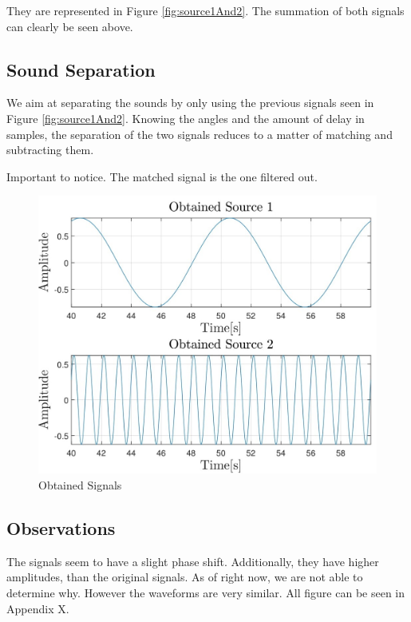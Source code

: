 They are represented in Figure \ref{fig:source1And2}. The summation of both signals can clearly 
be seen above.
\newpage
\subsection*{Sound Separation}
We aim at separating the sounds by only using the previous signals seen in Figure \ref{fig:source1And2}.
Knowing the angles and the amount of delay in samples, the separation of the two signals reduces to
a matter of matching and subtracting them. 

Important to notice. The matched signal is the one filtered out.
\begin{figure}[htp]
	\centering
	\includegraphics[width=\textwidth]{Illustrations/obtainedSource1And2.jpg}
	\caption{Obtained Signals}
	\label{fig:obtainedSignals}
\end{figure}

\subsection*{Observations}
The signals seem to have a slight phase shift. Additionally, they have higher amplitudes, than the original
signals. As of right now, we are not able to determine why. However the waveforms are very similar.
All figure can be seen in Appendix X.
\newpage

